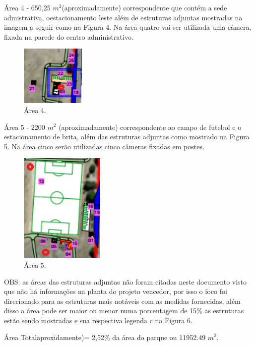 Área 4 - 650,25 $m^{2}$(aproximadamente) correspondente que contém a sede admistrativa, oestacionamento  leste além de estruturas adjuntas mostradas na imagem a seguir como na Figura 4. Na área quatro vai ser utilizada uma câmera, fixada na parede do centro administrativo.

\begin{figure}[H]
	 \centering
	\label{Área 4}
	 \includegraphics[keepaspectratio=true,scale=0.8]{monitoramento/4.png}
	 \caption{Área 4.}
\end{figure}

Área 5 - 2200 $m^{2}$ (aproximadamente) correspondente ao campo de futebol e o estacionamento de brita, além das estruturas adjuntas como mostrado  na Figura 5. Na área cinco serão utilizadas cinco câmeras fixadas em postes.

\begin{figure}[H]
	 \centering
	\label{Área 5}
	 \includegraphics[keepaspectratio=true,scale=0.8]{monitoramento/5.png}
	 \caption{Área 5.}
\end{figure}

OBS: as áreas das estruturas adjuntas não foram citadas neste documento visto que não há informações na planta do projeto vencedor, por isso o foco foi direcionado para as estruturas mais notáveis com as medidas fornecidas, além disso a área pode ser maior ou menor numa porcentagem de 15\% as estruturas estão sendo mostradas e sua respectiva legenda c na Figura 6.


Área Totalaproxidamente)= 2,52\% da área do parque ou 11952.49 $m^{2}$.

